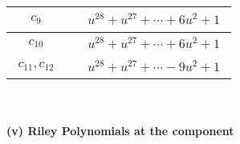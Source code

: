 \documentclass[1p]{elsarticle_modified}
\theoremstyle{definition}
\begin{document}
\begin{tabular}{m{50pt}|m{274pt}}
\hline $$\begin{aligned}c_{9}\end{aligned}$$&$\begin{aligned}
&u^{28}+u^{27}+\cdots+6 u^2+1
\end{aligned}$\\
\hline $$\begin{aligned}c_{10}\end{aligned}$$&$\begin{aligned}
&u^{28}+u^{27}+\cdots+6 u^2+1
\end{aligned}$\\
\hline $$\begin{aligned}c_{11},c_{12}\end{aligned}$$&$\begin{aligned}
&u^{28}+u^{27}+\cdots-9 u^2+1
\end{aligned}$\\
\hline
\end{tabular}\\~\\
\newpage\renewcommand{\arraystretch}{1}
\flushleft \textbf{(v) Riley Polynomials at the component}\newline \\
\end{document}
